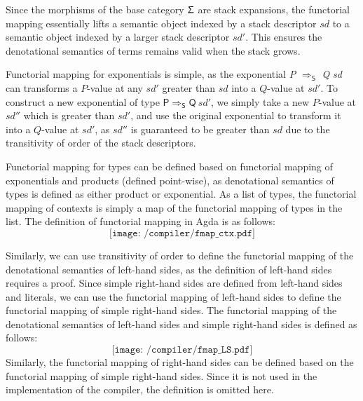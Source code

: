 \documentclass[12pt,a4paper]{report}
\theoremstyle{definition}
\begin{document}
    Since the morphisms of the base category $\Upsigma$ are stack expansions, the functorial mapping essentially lifts a semantic object indexed by a stack descriptor $\textit{sd}$ to a semantic object indexed by a larger stack descriptor $\textit{sd′}$. This ensures the denotational semantics of terms remains valid when the stack grows.

    Functorial mapping for exponentials is simple, as the exponential \textit{P} $\mathsf{\Rightarrow_\textsf{S}}$ \textit{Q} \textit{sd} can transforms a $P$-value at any $\textit{sd′}$ greater than $\textit{sd}$ into a $Q$-value at $\textit{sd′}$. To construct a new exponential of type $\mathsf{P \Rightarrow_\textsf{S} Q\ \textit{sd′}}$, we simply take a new $P$-value at $\textit{sd″}$ which is greater than $\textit{sd′}$, and use the original exponential to transform it into a $Q$-value at $\textit{sd′}$, as $\textit{sd″}$ is guaranteed to be greater than $\textit{sd}$ due to the transitivity of order of the stack descriptors. 

    Functorial mapping for types can be defined based on functorial mapping of exponentials and products (defined point-wise), as denotational semantics of types is defined as either product or exponential. As a list of types, the functorial mapping of contexts is simply a map of the functorial mapping of types in the list. The definition of functorial mapping in Agda is as follows:
    \[\texttt{[image: /compiler/fmap\_ctx.pdf]}\]

    Similarly, we can use transitivity of order to define the functorial mapping of the denotational semantics of left-hand sides, as the definition of left-hand sides requires a proof. Since simple right-hand sides are defined from left-hand sides and literals, we can use the functorial mapping of left-hand sides to define the functorial mapping of simple right-hand sides. The functorial mapping of the denotational semantics of left-hand sides and simple right-hand sides is defined as follows:
    \[\texttt{[image: /compiler/fmap\_LS.pdf]}\]
    Similarly, the functorial mapping of right-hand sides can be defined based on the functorial mapping of simple right-hand sides. Since it is not used in the implementation of the compiler, the definition is omitted here.
\end{document}
